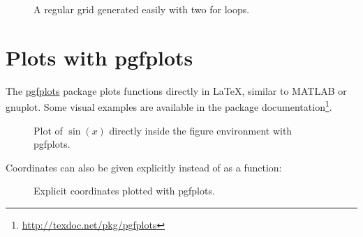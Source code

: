 \begin{ltgexample}
\begin{figure}[ht]
  \centering
  \caption{A regular grid generated easily with two for loops.}\label{fig:tikz_example}
\end{figure}
\end{ltgexample}

\section{Plots with pgfplots}

The \href{https://ctan.org/pkg/pgfplots}{pgfplots} package plots functions directly in \LaTeX{}, similar to MATLAB or gnuplot.
Some visual examples are available in the package documentation\footnote{\url{http://texdoc.net/pkg/pgfplots}}.

\begin{ltgexample}
\begin{figure}[ht]
  \centering
  \caption{Plot of $\sin(x)$ directly inside the figure environment with pgfplots.}
  \label{fig:pgfplots_example}
\end{figure}
\end{ltgexample}

Coordinates can also be given explicitly instead of as a function:
\begin{ltgexample}
\begin{figure}[ht]
  \centering
  \caption{Explicit coordinates plotted with pgfplots.}
  \label{fig:pgfplots_coords}
\end{figure}
\end{ltgexample}


